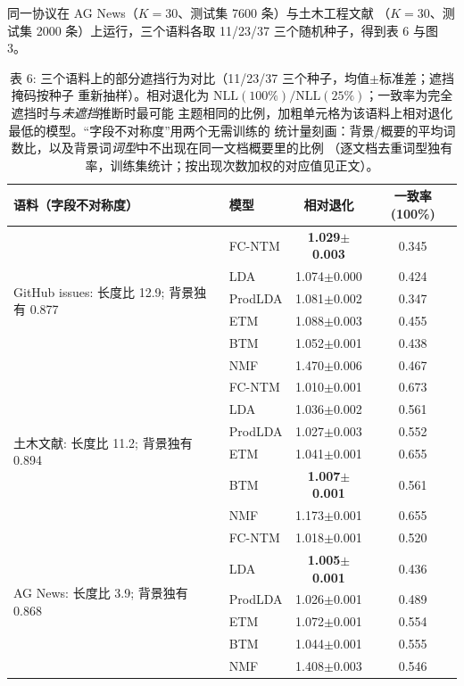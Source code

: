 \documentclass{article}
\begin{document}
同一协议在 AG News（$K=30$、测试集 7600 条）与土木工程文献
（$K=30$、测试集 2000 条）上运行，三个语料各取 11/23/37
三个随机种子，得到表 6 与图 3。

\begin{table}[t]
\centering
\caption{表 6: 三个语料上的部分遮挡行为对比（11/23/37 三个种子，均值$\pm$标准差；遮挡掩码按种子
重新抽样）。相对退化为
$\mathrm{NLL}(100\%)/\mathrm{NLL}(25\%)$；一致率为完全遮挡时与\emph{未遮挡}推断时最可能
主题相同的比例，加粗单元格为该语料上相对退化最低的模型。“字段不对称度”用两个无需训练的
统计量刻画：背景/概要的平均词数比，以及背景词\emph{词型}中不出现在同一文档概要里的比例
（逐文档去重词型独有率，训练集统计；按出现次数加权的对应值见正文）。}
\label{tab:occl-cross}
\small
\setlength{\tabcolsep}{4pt}
\begin{tabular}{@{}llcc@{}}
\toprule
语料（字段不对称度） & 模型 & 相对退化 & 一致率(100\%) \\
\midrule
\multirow{6}{*}{GitHub issues: 长度比 12.9; 背景独有 0.877}
 & FC-NTM & \textbf{1.029$\pm$0.003} & 0.345 \\
 & LDA & 1.074$\pm$0.000 & 0.424 \\
 & ProdLDA & 1.081$\pm$0.002 & 0.347 \\
 & ETM & 1.088$\pm$0.003 & 0.455 \\
 & BTM & 1.052$\pm$0.001 & 0.438 \\
 & NMF & 1.470$\pm$0.006 & 0.467 \\
\midrule
\multirow{6}{*}{土木文献: 长度比 11.2; 背景独有 0.894}
 & FC-NTM & 1.010$\pm$0.001 & 0.673 \\
 & LDA & 1.036$\pm$0.002 & 0.561 \\
 & ProdLDA & 1.027$\pm$0.003 & 0.552 \\
 & ETM & 1.041$\pm$0.001 & 0.655 \\
 & BTM & \textbf{1.007$\pm$0.001} & 0.561 \\
 & NMF & 1.173$\pm$0.001 & 0.655 \\
\midrule
\multirow{6}{*}{AG News: 长度比 3.9; 背景独有 0.868}
 & FC-NTM & 1.018$\pm$0.001 & 0.520 \\
 & LDA & \textbf{1.005$\pm$0.001} & 0.436 \\
 & ProdLDA & 1.026$\pm$0.001 & 0.489 \\
 & ETM & 1.072$\pm$0.001 & 0.554 \\
 & BTM & 1.044$\pm$0.001 & 0.555 \\
 & NMF & 1.408$\pm$0.003 & 0.546 \\
\bottomrule
\end{tabular}
\end{table}
\end{document}
